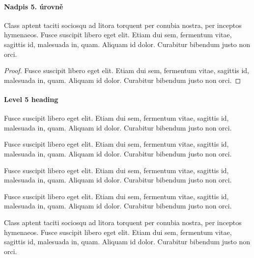 \paragraph{Nadpis 5. úrovně}

\begin{theorem}
Class aptent taciti sociosqu ad litora torquent per conubia nostra, per inceptos hymenaeos. Fusce suscipit libero eget elit. Etiam dui sem, fermentum vitae, sagittis id, malesuada in, quam. Aliquam id dolor. Curabitur bibendum justo non orci.
\end{theorem}

\begin{proof}
Fusce suscipit libero eget elit. Etiam dui sem, fermentum vitae, sagittis id, malesuada in, quam. Aliquam id dolor. Curabitur bibendum justo non orci.
\end{proof}

\paragraph{Level 5 heading}

\begin{corollary}
Fusce suscipit libero eget elit. Etiam dui sem, fermentum vitae, sagittis id, malesuada in, quam. Aliquam id dolor. Curabitur bibendum justo non orci.
\end{corollary}

\begin{proposition}
Fusce suscipit libero eget elit. Etiam dui sem, fermentum vitae, sagittis id, malesuada in, quam. Aliquam id dolor. Curabitur bibendum justo non orci.
\end{proposition}

\begin{note}
Fusce suscipit libero eget elit. Etiam dui sem, fermentum vitae, sagittis id, malesuada in, quam. Aliquam id dolor. Curabitur bibendum justo non orci.
\end{note}

\begin{remark}
Fusce suscipit libero eget elit. Etiam dui sem, fermentum vitae, sagittis id, malesuada in, quam. Aliquam id dolor. Curabitur bibendum justo non orci.
\end{remark}

\begin{lemma}
Class aptent taciti sociosqu ad litora torquent per conubia nostra, per inceptos hymenaeos. Fusce suscipit libero eget elit. Etiam dui sem, fermentum vitae, sagittis id, malesuada in, quam. Aliquam id dolor. Curabitur bibendum justo non orci.
\end{lemma}

